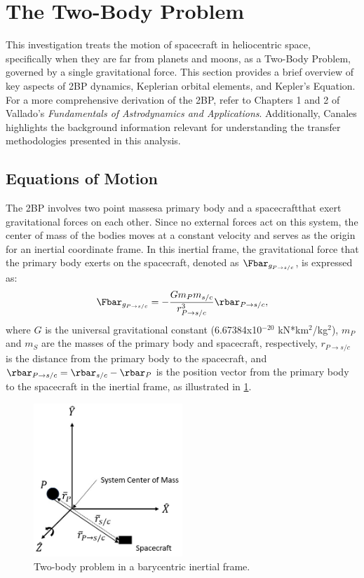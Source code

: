 \section{The Two-Body Problem}
This investigation treats the motion of spacecraft in heliocentric space, specifically when they
are far from planets and moons, as a Two-Body Problem, governed by a single gravitational force.
This section provides a brief overview of key aspects of 2BP dynamics, Keplerian orbital elements,
and Kepler's Equation. For a more comprehensive derivation of the 2BP, refer to Chapters 1 and 2 of
Vallado's \emph{Fundamentals of Astrodynamics and Applications}\cite{Vallado:2013}. Additionally,
Canales highlights the background information relevant for understanding the transfer methodologies
presented in this analysis\cite{Canales:2021}.

\subsection{Equations of Motion}
The 2BP involves two point masses\textemdash a primary body and a spacecraft\textemdash that exert
gravitational forces on each other. Since no external forces act on this system, the center of mass
of the bodies moves at a constant velocity and serves as the origin for an inertial coordinate
frame. In this inertial frame, the gravitational force that the primary body exerts on the
spacecraft, denoted as $\Fbar_{g_{P\rightarrow s/c}}$, is expressed as:
\begin{equation}
    \Fbar_{g_{P\rightarrow s/c}}=-\frac{Gm_{P}m_{s/c}}{r_{P\rightarrow s/c}^{3}}\rbar_{P\rightarrow s/c},
    \label{eq:gravity}
\end{equation}
where $G$ is the universal gravitational constant (6.67384x10$^{-20}$ kN*km$^{2}$/kg$^{2}$),
$m_{P}$ and $m_{S}$ are the masses of the primary body and spacecraft, respectively,
$r_{P\rightarrow s/c}$ is the distance from the primary body to the spacecraft, and
$\rbar_{P\rightarrow s/c}=\rbar_{s/c}-\rbar_{P}$ is the position vector from the primary body to
the spacecraft in the inertial frame, as illustrated in \cref{fig:2BP}.

\begin{figure}[ht]
    \centering
    \includegraphics[width=0.5\textwidth]{figures/TBP.jpg}
    \caption{Two-body problem in a barycentric inertial frame.}
    \label{fig:2BP}
\end{figure}

